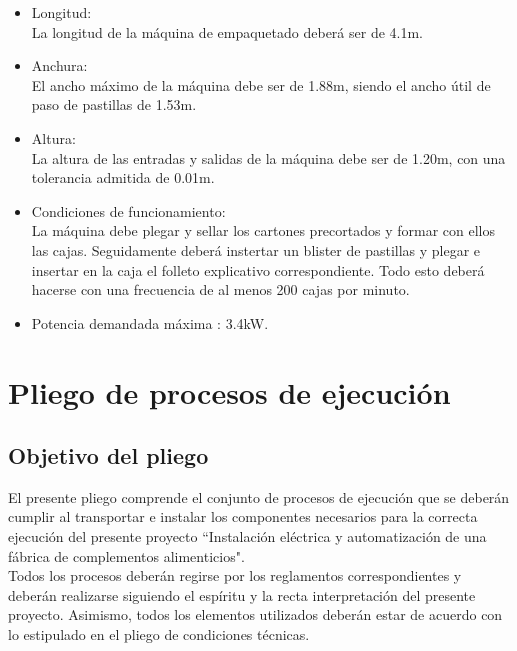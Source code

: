 		\begin{itemize}
			\item{Longitud:}\\
			La longitud de la máquina de empaquetado deberá ser de 4.1m. 

			\item{Anchura:}\\
			El ancho máximo de la máquina debe ser de 1.88m, siendo el ancho útil de paso de pastillas de 1.53m.
			
			\item{Altura:}\\
			La altura de las entradas y salidas de la máquina debe ser de 1.20m, con una tolerancia admitida de 0.01m.
			
			
			\item{Condiciones de funcionamiento: }\\
			La máquina debe plegar y sellar los cartones precortados y formar con ellos las cajas. Seguidamente deberá instertar un blister de pastillas y plegar e insertar en la caja el folleto explicativo correspondiente. Todo esto deberá hacerse con una frecuencia de al menos 200 cajas por minuto.
			

			\item{Potencia demandada máxima :} 3.4kW.
		
		\end{itemize}



\newpage\section {Pliego de procesos de ejecución}

\subsection{Objetivo del pliego}	
El presente pliego comprende el conjunto de procesos de ejecución que se deberán cumplir al transportar e instalar los componentes necesarios para la correcta ejecución del presente proyecto ``Instalación eléctrica y automatización de una fábrica de complementos alimenticios".
\\
Todos los procesos deberán regirse por los reglamentos correspondientes y deberán realizarse siguiendo el espíritu y la recta interpretación del presente proyecto. Asimismo, todos los elementos utilizados deberán estar de acuerdo con lo estipulado en el pliego de condiciones técnicas.

